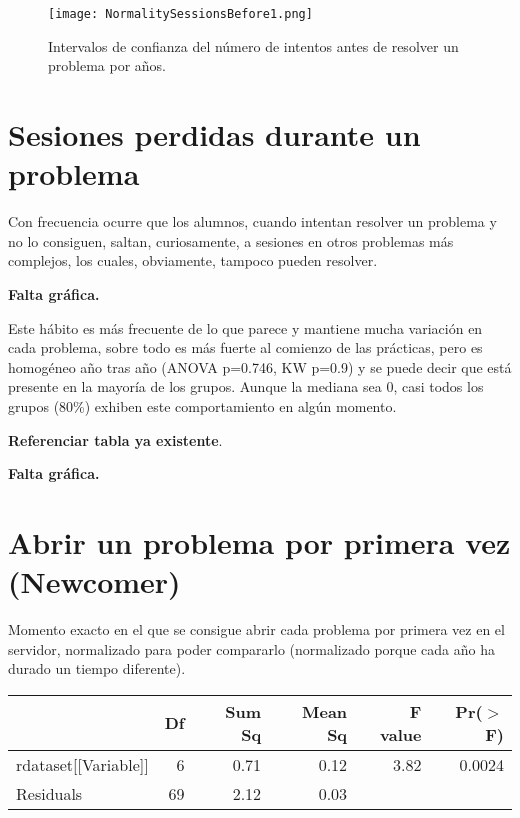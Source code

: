 \begin{figure}[H]
    \centering
    \texttt{[image: NormalitySessionsBefore1.png]}
    \caption{Intervalos de confianza del número de intentos antes de resolver un problema por años.}
    \label{fig:confidencesessionsbefore}
\end{figure}

\section{Sesiones perdidas durante un problema}

Con frecuencia ocurre que los alumnos, cuando intentan resolver un problema y no lo consiguen, saltan, curiosamente, a sesiones en otros problemas más complejos, los cuales, obviamente, tampoco pueden resolver.

\textbf{Falta gráfica.}

Este hábito es más frecuente de lo que parece y mantiene mucha variación en cada problema, sobre todo es más fuerte al comienzo de las prácticas, pero es homogéneo año tras año (ANOVA p=0.746, KW p=0.9) y se puede decir que está presente en la mayoría de los grupos. Aunque la mediana sea 0, casi todos los grupos (80\%) exhiben este comportamiento en algún momento.

\textbf{Referenciar tabla ya existente}.

\textbf{Falta gráfica.}

\section{Abrir un problema por primera vez (Newcomer)}

Momento exacto en el que se consigue abrir cada problema por primera vez en el servidor, normalizado para poder compararlo (normalizado porque cada año ha durado un tiempo diferente).

\begin{table}[H]
\centering
\begin{tabular}{lrrrrr}
  \hline
 & Df & Sum Sq & Mean Sq & F value & Pr($>$F) \\ 
  \hline
rdataset[[Variable]] & 6 & 0.71 & 0.12 & 3.82 & 0.0024 \\ 
  Residuals            & 69 & 2.12 & 0.03 &  &  \\ 
   \hline
\end{tabular}
\end{table}

